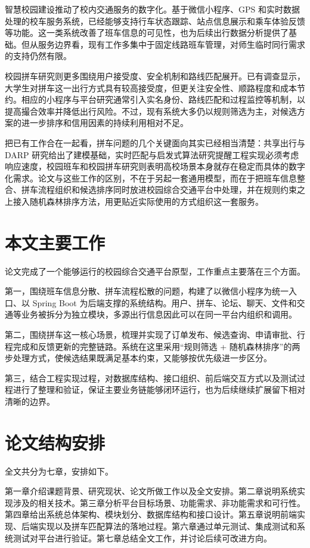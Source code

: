 智慧校园建设推动了校内交通服务的数字化。基于微信小程序、GPS 和实时数据处理的校车服务系统，已经能够支持行车状态跟踪、站点信息展示和乘车体验反馈等功能\cite{zhu2024,yang2018}。这一类系统改善了班车信息的可见性，也为后续出行数据分析提供了基础。但从服务边界看，现有工作多集中于固定线路班车管理，对师生临时同行需求的支持仍然有限。

校园拼车研究则更多围绕用户接受度、安全机制和路线匹配展开。已有调查显示，大学生对拼车这一出行方式具有较高接受度，但更关注安全性、顺路程度和成本节约\cite{wei2023,zou2020,wu2017}。相应的小程序与平台研究通常引入实名身份、路线匹配和过程监控等机制，以提高撮合效率并降低出行风险\cite{yuan2023,sun2016,wang2020,liang2016}。不过，现有系统大多仍以规则筛选为主，对候选方案的进一步排序和信用因素的持续利用相对不足。

把已有工作合在一起看，拼车问题的几个关键面向其实已经相当清楚：共享出行与 DARP 研究给出了建模基础，实时匹配与启发式算法研究提醒工程实现必须考虑响应速度，校园班车和校园拼车研究则表明高校场景本身就存在稳定而具体的数字化需求。论文与这些工作的区别，不在于另起一套通用模型，而在于把班车信息整合、拼车流程组织和候选排序同时放进校园综合交通平台中处理，并在规则约束之上接入随机森林排序方法，用更贴近实际使用的方式组织这一套服务。

\section{本文主要工作}

论文完成了一个能够运行的校园综合交通平台原型，工作重点主要落在三个方面。

第一，围绕班车信息分散、拼车流程松散的问题，构建了以微信小程序为统一入口、以 Spring Boot 为后端支撑的系统结构。用户、拼车、论坛、聊天、文件和交通等业务被拆分为独立模块，多源出行信息因此可以在同一平台内组织和调用。

第二，围绕拼车这一核心场景，梳理并实现了订单发布、候选查询、申请审批、行程完成和反馈更新的完整链路。系统在这里采用“规则筛选 + 随机森林排序”的两步处理方式，使候选结果既满足基本约束，又能够按优先级进一步区分。

第三，结合工程实现过程，对数据库结构、接口组织、前后端交互方式以及测试过程进行了整理和验证，保证主要业务链能够闭环运行，也为后续继续扩展留下相对清晰的边界。

\section{论文结构安排}

全文共分为七章，安排如下。

第一章介绍课题背景、研究现状、论文所做工作以及全文安排。第二章说明系统实现涉及的相关技术。第三章分析平台目标场景、功能需求、非功能需求和可行性。第四章给出系统总体架构、模块划分、数据库结构和接口设计。第五章说明前端实现、后端实现以及拼车匹配算法的落地过程。第六章通过单元测试、集成测试和系统测试对平台进行验证。第七章总结全文工作，并讨论后续可改进方向。
